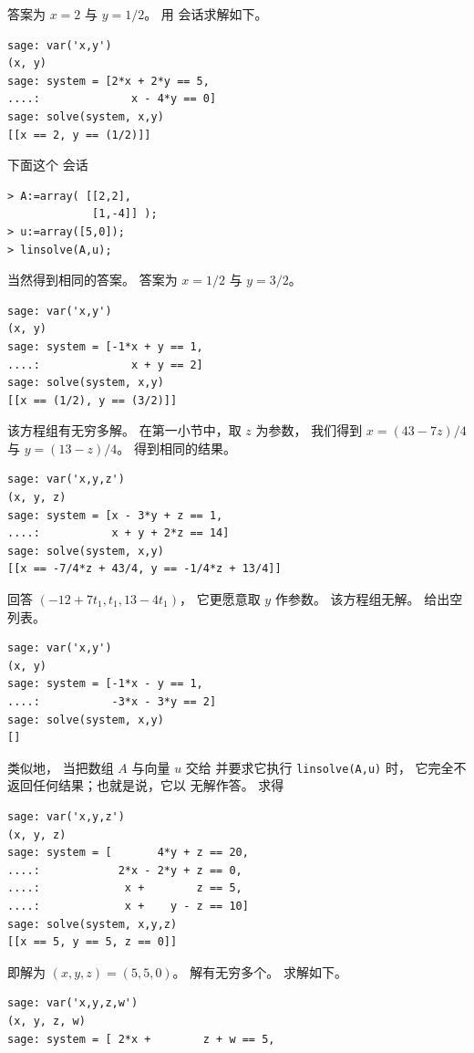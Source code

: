 \begin{exercises}
\begin{answer}
\begin{exparts}
        \partsitem 答案为 \( x=2 \) 与 \( y=1/2 \)。
          用 \Sage{} 会话求解如下。
\begin{lstlisting}
sage: var('x,y')
(x, y)
sage: system = [2*x + 2*y == 5,
....:              x - 4*y == 0]
sage: solve(system, x,y)
[[x == 2, y == (1/2)]]          
\end{lstlisting}
          下面这个 \Maple{} 会话
\begin{lstlisting}
> A:=array( [[2,2],
             [1,-4]] );
> u:=array([5,0]);
> linsolve(A,u);            
\end{lstlisting}
          当然得到相同的答案。
        \partsitem 答案为 \( x=1/2 \) 与 \( y=3/2 \)。 
\begin{lstlisting}
sage: var('x,y')
(x, y)
sage: system = [-1*x + y == 1,
....:              x + y == 2]
sage: solve(system, x,y)
[[x == (1/2), y == (3/2)]]          
\end{lstlisting}
        \partsitem 该方程组有无穷多解。
           在第一小节中，取 $z$ 为参数，
           我们得到 $x=(43-7z)/4$ 与 $y=(13-z)/4$。
           \Sage{} 得到相同的结果。
\begin{lstlisting}
sage: var('x,y,z')
(x, y, z)
sage: system = [x - 3*y + z == 1,
....:           x + y + 2*z == 14]
sage: solve(system, x,y)
[[x == -7/4*z + 43/4, y == -1/4*z + 13/4]]             
\end{lstlisting}
           \Maple{} 回答 $(-12+7t_1, t_1, 13-4t_1)$，
           它更愿意取 $y$ 作参数。
        \partsitem 该方程组无解。
           \Sage{} 给出空列表。
\begin{lstlisting}
sage: var('x,y')
(x, y)
sage: system = [-1*x - y == 1,
....:           -3*x - 3*y == 2]
sage: solve(system, x,y)
[]          
\end{lstlisting}
           类似地，
           当把数组 $A$ 与向量 $u$ 交给 \Maple{}
           并要求它执行 \lstinline!linsolve(A,u)! 时，
           它完全不返回任何结果；也就是说，它以
           无解作答。
        \partsitem \Sage{} 求得 
\begin{lstlisting}
sage: var('x,y,z')
(x, y, z)
sage: system = [       4*y + z == 20,
....:            2*x - 2*y + z == 0,
....:             x +        z == 5,
....:             x +    y - z == 10]
sage: solve(system, x,y,z)
[[x == 5, y == 5, z == 0]]          
\end{lstlisting}
           即解为 \( (x,y,z)=(5,5,0) \)。
        \partsitem 解有无穷多个。
           \Sage{} 求解如下。
\begin{lstlisting}
sage: var('x,y,z,w')
(x, y, z, w)
sage: system = [ 2*x +        z + w == 5,

\end{lstlisting}
\end{exparts}
\end{answer}
\end{exercises}
